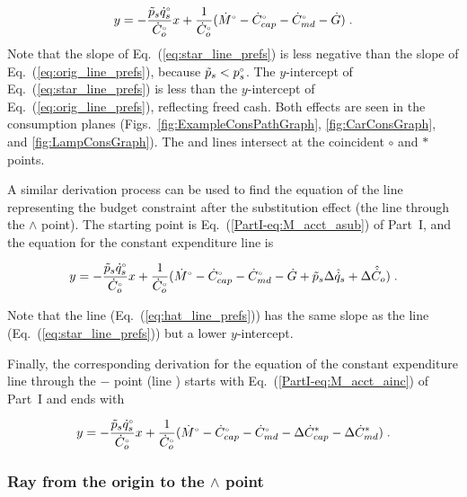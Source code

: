 \begin{equation} \label{eq:star_line_prefs}
  y = - \frac{\tilde{p}_s {}{\dot{q}}^{\scriptscriptstyle \circ}_s}{{}{\dot{C}}^{\scriptscriptstyle \circ}_o} x
         + \frac{1}{{}{\dot{C}}^{\scriptscriptstyle \circ}_o} ({}{\dot{M}}^{\scriptscriptstyle \circ} - {}{\dot{C}}^{\scriptscriptstyle \circ}_{cap} - {}{\dot{C}}^{\scriptscriptstyle \circ}_{md} - \dot{G}) \; .
\end{equation}
%
Note that the slope of Eq.~(\ref{eq:star_line_prefs}) is less negative
than the slope of Eq.~(\ref{eq:orig_line_prefs}), 
because $\tilde{p}_s < {}{p}^{\scriptscriptstyle \circ}_s$.
The $y$-intercept of Eq.~(\ref{eq:star_line_prefs}) is less than the 
$y$-intercept of Eq.~(\ref{eq:orig_line_prefs}),
reflecting freed cash.
Both effects are seen in
the consumption planes
(Figs.~\ref{fig:ExampleConsPathGraph}, \ref{fig:CarConsGraph}, and \ref{fig:LampConsGraph}).
The \circcirc{} and \starstar{} lines intersect at the coincident $\circ$ and $*$ points.

A similar derivation process can be used to find the equation of 
the line representing the budget constraint
after the substitution effect (the \hathat{} line through the $\wedge$ point).
The starting point is Eq.~(\ref{PartI-eq:M_acct_asub}) of Part~I, and 
the equation for the constant expenditure line is

\begin{equation} \label{eq:hat_line_prefs}
  y = - \frac{\tilde{p}_s {}{\dot{q}}^{\scriptscriptstyle \circ}_s}{{}{\dot{C}}^{\scriptscriptstyle \circ}_o} x
         + \frac{1}{{}{\dot{C}}^{\scriptscriptstyle \circ}_o} ({}{\dot{M}}^{\scriptscriptstyle \circ} - {}{\dot{C}}^{\scriptscriptstyle \circ}_{cap} - {}{\dot{C}}^{\scriptscriptstyle \circ}_{md} 
                                   - \dot{G} + \tilde{p}_s \Delta \hat{\dot{q}}_s + \Delta \hat{\dot{C}}_o) \; .
\end{equation}

Note that the \hathat{} line (Eq.~(\ref{eq:hat_line_prefs})) has the same slope as 
the \starstar{} line (Eq.~(\ref{eq:star_line_prefs}))
but a lower $y$-intercept.

Finally, the corresponding derivation
for the equation of the constant expenditure line through the 
$-$ point (line \barbar{}) starts with Eq.~(\ref{PartI-eq:M_acct_ainc}) of Part~I and ends with 

\begin{equation} \label{eq:bar_line_prefs}
  y = - \frac{\tilde{p}_s {}{\dot{q}}^{\scriptscriptstyle \circ}_s}{{}{\dot{C}}^{\scriptscriptstyle \circ}_o} x
        + \frac{1}{{}{\dot{C}}^{\scriptscriptstyle \circ}_o} ({}{\dot{M}}^{\scriptscriptstyle \circ} - {}{\dot{C}}^{\scriptscriptstyle \circ}_{cap} - {}{\dot{C}}^{\scriptscriptstyle \circ}_{md} 
                                   - \Delta {\dot{C}}^*_{cap} - \Delta {\dot{C}}^*_{md}) \; .
\end{equation}


\subsubsection{Ray from the origin to the $\wedge$ point} 
\label{sec:pref_graph_ray}

